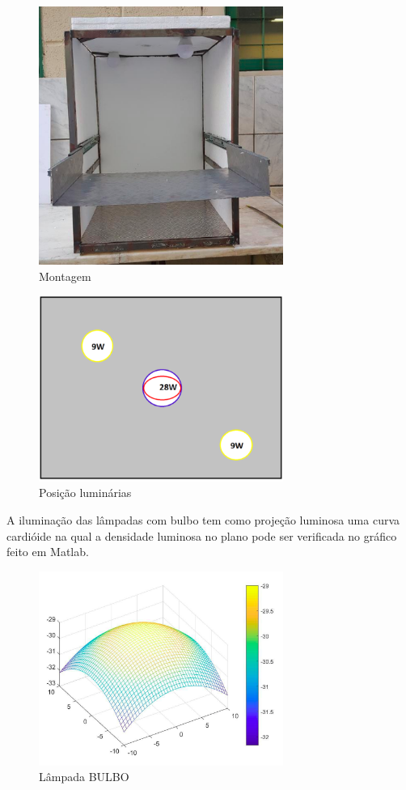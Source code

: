 \begin{figure}[H]
	\centering
	\includegraphics[width=8cm]{figuras/montagem.png}
	\caption{Montagem}
	\label{montagem}
\end{figure}

\begin{figure}[H]
	\centering
	\includegraphics[width=8cm]{figuras/posicao_luminarias.png}
	\caption{Posição luminárias}
	\label{posicao_luminarias}
\end{figure}

A iluminação das lâmpadas com bulbo tem como projeção luminosa uma curva cardióide na qual a densidade luminosa no plano pode ser verificada no gráfico feito em Matlab.

\begin{figure}[H]
	\centering
	\includegraphics[width=8cm]{figuras/bulbo.png}
	\caption{Lâmpada BULBO}
	\label{bulbo}
\end{figure}

